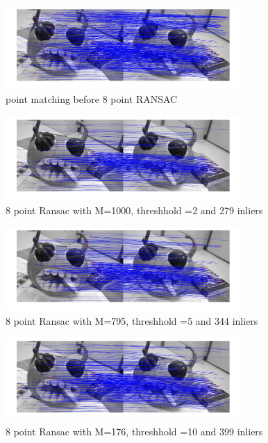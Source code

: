 \documentclass[12pt]{article}
\begin{document}
\newline
\begin{figure}[ht]
	\centering
	\includegraphics[width=0.8\textwidth]{8r.jpg}
	\caption{point matching before 8 point RANSAC }
	\label{fig1}
\end{figure}
\vspace{5mm}
\newline



\newline
\begin{figure}[ht]
	\centering
	\includegraphics[width=0.8\textwidth]{8r1000_279.jpg}
	\caption{8 point Ransac with M=1000, threshhold =2 and 279 inliers}
	\label{fig1}
\end{figure}
\vspace{5mm}
\newline



\begin{figure}[ht]
	\centering
	\includegraphics[width=0.8\textwidth]{8r795_344.jpg}
	\caption{8 point Ransac with M=795, threshhold =5 and 344 inliers}
	\label{fig1}
\end{figure}
\vspace{5mm}


\begin{figure}[ht]
	\centering
	\includegraphics[width=0.8\textwidth]{8r176_399.jpg}
	\caption{8 point Ransac with M=176, threshhold =10 and 399 inliers}
	\label{fig1}
\end{figure}
\vspace{5mm}
\end{document}
